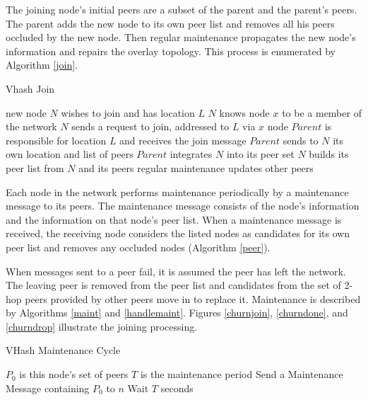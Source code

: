 \documentclass{IEEEtran}
\begin{document}
The joining node's initial peers are a subset of the parent and the parent's peers. The parent adds the new node to its own peer list and removes all his peers occluded by the new node.  Then regular maintenance propagates the new node's information and repairs the overlay topology.  This process is enumerated by Algorithm \ref{join}.


\begin{algorithm}
\caption{Vhash Join}
\label{join}
\begin{algorithmic}[1]  %
\STATE new node $N$ wishes to join and has location $L$
\STATE $N$ knows node $x$ to be a member of the network
\STATE $N$ sends a request to join, addressed to $L$ via $x$
\STATE node $Parent$ is responsible for location $L$ and receives the join message
\STATE $Parent$ sends to $N$ its own location and list of peers
\STATE $Parent$ integrates $N$ into its peer set
\STATE $N$ builds its peer list from $N$ and its peers
\STATE regular maintenance updates other peers
\end{algorithmic}
\end{algorithm}




Each node in the network performs maintenance periodically by a maintenance message to its peers. The maintenance message consists of the node's information and the information on that node's peer list. When a maintenance message is received, the receiving node considers the listed nodes as candidates for its own peer list and removes any occluded nodes (Algorithm \ref{peer}). 

When messages sent to a peer fail, it is assumed the peer has left the network. The leaving peer is removed from the peer list and candidates from the set of 2-hop peers provided by other peers move in to replace it.  Maintenance is described by Algorithms \ref{maint} and \ref{handlemaint}.  Figures \ref{churnjoin}, \ref{churndone}, and \ref{churndrop} illustrate the joining processing.

\begin{algorithm}
\caption{VHash Maintenance Cycle}
\label{maint}
\begin{algorithmic}[1]  %
	\STATE $P_0$ is this node's set of peers
    \STATE $T$ is the maintenance period
        	\STATE Send a Maintenance Message containing $P_0$ to $n$
        \ENDFOR
    \STATE Wait $T$ seconds
    \ENDWHILE
\end{algorithmic}
\end{algorithm}
\end{document}
